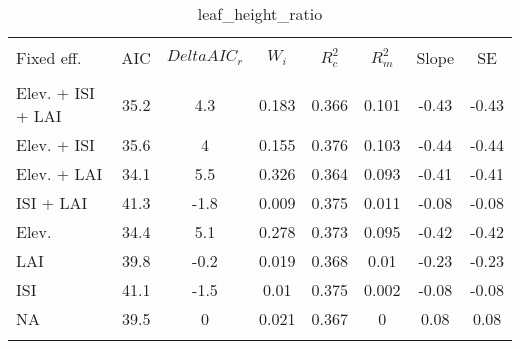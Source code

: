 
\begin{table}[!htbp] \centering 
  \caption{leaf_height_ratio} 
  \label{leaf_height_ratio} 
\begin{tabular}{@{\extracolsep{5pt}} lS[table-format=3.2]S[table-format=3.2]S[table-format=3.2]S[table-format=3.2]S[table-format=3.2]S[table-format=3.2]S[table-format=3.2]} 
\\[-1.8ex]\hline 
\hline \\[-1.8ex] 
{Fixed eff.} & {AIC} & {$Delta{}AIC_r$} & {$W_i$} & {$R^2_c$} & {$R^2_m$} & {Slope} & {SE} \\
\hline \\[-1.8ex] 
Elev. + ISI + LAI & 35.2 & 4.3 & 0.183 & 0.366 & 0.101 & -0.43 & -0.43 \\ 
Elev. + ISI & 35.6 & 4 & 0.155 & 0.376 & 0.103 & -0.44 & -0.44 \\ 
Elev. + LAI & 34.1 & 5.5 & 0.326 & 0.364 & 0.093 & -0.41 & -0.41 \\ 
ISI + LAI & 41.3 & -1.8 & 0.009 & 0.375 & 0.011 & -0.08 & -0.08 \\ 
Elev. & 34.4 & 5.1 & 0.278 & 0.373 & 0.095 & -0.42 & -0.42 \\ 
LAI & 39.8 & -0.2 & 0.019 & 0.368 & 0.01 & -0.23 & -0.23 \\ 
ISI & 41.1 & -1.5 & 0.01 & 0.375 & 0.002 & -0.08 & -0.08 \\ 
NA & 39.5 & 0 & 0.021 & 0.367 & 0 & 0.08 & 0.08 \\ 
\hline \\[-1.8ex] 
\end{tabular} 
\end{table} 
